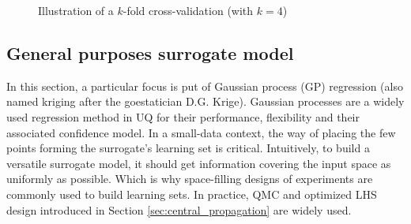 
\begin{figure}[ht]
    \centering
      \caption{Illustration of a $k$-fold cross-validation (with $k=4$)} 
      \label{fig:kfold}
\end{figure}



\subsection{General purposes surrogate model}

In this section, a particular focus is put of Gaussian process (GP) regression (also named kriging after the goestatician D.G. Krige). 
Gaussian processes are a widely used regression method in UQ for their performance, flexibility and their associated confidence model. 
In a small-data context, the way of placing the few points forming the surrogate's learning set is critical. 
Intuitively, to build a versatile surrogate model, it should get information covering the input space as uniformly as possible. 
Which is why space-filling designs of experiments are commonly used to build learning sets.     
In practice, QMC and optimized LHS design introduced in Section \ref{sec:central_propagation} are widely used.  

